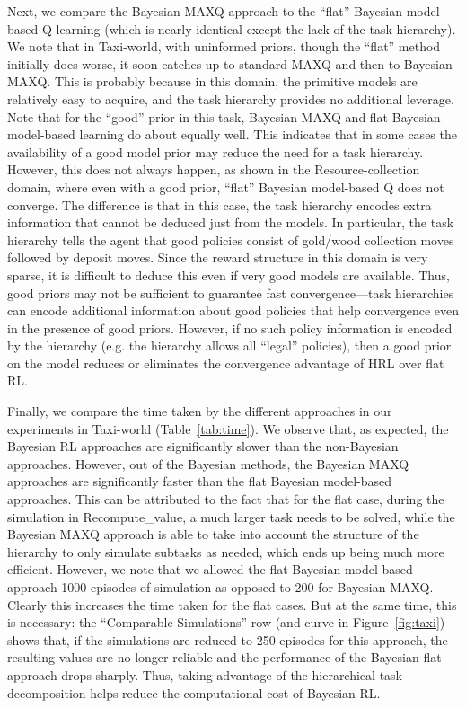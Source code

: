 Next, we compare the Bayesian MAXQ approach to the ``flat'' Bayesian
model-based Q learning (which is nearly identical except the lack of
the task hierarchy). We note that in {\sf Taxi-world}, with uninformed
priors, though the ``flat'' method initially does worse, it soon catches up to standard
MAXQ and then to Bayesian MAXQ. This is probably because in this
domain, the primitive models are relatively easy to acquire, and the
task hierarchy provides no additional leverage. Note that for the
``good'' prior in this task, Bayesian MAXQ and flat Bayesian
model-based learning do about equally well. This indicates that in some
cases the availability of a good model prior may reduce the need for a
task hierarchy. However, this does not always happen, as shown in the
{\sf Resource-collection} domain, where even with a good prior,
``flat'' Bayesian model-based Q does not converge. The difference is
that in this case, the task hierarchy encodes extra information that
cannot be deduced just from the models. In particular, the task
hierarchy tells the agent that good policies consist of gold/wood
collection moves followed by deposit moves. Since the reward structure
in this domain is very sparse, it is difficult to deduce this even if very
good models are available. Thus, good priors may not be sufficient to
guarantee fast convergence---task hierarchies can encode additional
information about good policies that help convergence even in the presence
of good priors. However, if no such policy information is encoded by
the hierarchy (e.g. the hierarchy allows all ``legal'' policies),
then a good prior on the model reduces or eliminates the convergence advantage of
HRL over flat RL.

Finally, we compare the time taken by the different approaches in our
experiments in {\sf Taxi-world} (Table~\ref{tab:time}). We observe that, as expected, the
Bayesian RL approaches are significantly slower than the non-Bayesian
approaches. However, out of the Bayesian methods, the Bayesian MAXQ approaches are
significantly faster than the flat Bayesian model-based
approaches. This can be attributed to the fact that for the flat case,
during the simulation in {\sc Recompute\_value}, a much larger task
needs to be solved, while the Bayesian MAXQ approach is able to take
into account the structure of the hierarchy to only simulate subtasks
as needed, which ends up being much more efficient. However, we note
that we allowed the flat Bayesian model-based approach 1000 episodes
of simulation as opposed to 200 for Bayesian MAXQ. Clearly this
increases the time taken for the flat cases. But at the same time,
this is necessary: the ``Comparable Simulations'' row (and curve in
Figure~\ref{fig:taxi}) shows that, if the simulations are reduced to
250 episodes for this approach, the resulting values are no longer reliable and the performance of
the Bayesian flat approach drops sharply. Thus, taking advantage of
the hierarchical task decomposition helps reduce the computational cost of
Bayesian RL.

